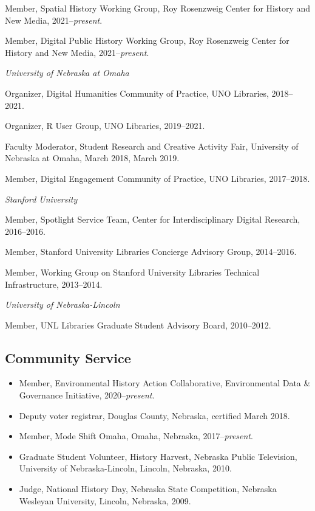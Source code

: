 \documentclass[10pt]{article}
\begin{document}
Member, Spatial History Working Group, Roy Rosenzweig Center for History and New Media, 2021--\textit{present}.

Member, Digital Public History Working Group, Roy Rosenzweig Center for History and New Media, 2021--\textit{present}.

\vspace{.4cm}

\textit{University of Nebraska at Omaha}

Organizer, Digital Humanities Community of Practice, UNO Libraries, 2018--2021.

Organizer, R User Group, UNO Libraries, 2019--2021.

Faculty Moderator, Student Research and Creative Activity Fair, University of
Nebraska at Omaha, March 2018, March 2019.

Member, Digital Engagement Community of Practice, UNO Libraries, 2017--2018.

\vspace{.4cm}

\textit{Stanford University}

Member, Spotlight Service Team, Center for Interdisciplinary Digital Research, 2016--2016.

Member, Stanford University Libraries Concierge Advisory Group, 2014--2016.

Member, Working Group on Stanford University Libraries Technical Infrastructure, 2013--2014.

\vspace{.4cm}

\textit{University of Nebraska-Lincoln}

Member, UNL Libraries Graduate Student Advisory Board, 2010--2012.

\subsection{Community Service}

\begin{itemize}
  \item Member, Environmental History Action Collaborative, Environmental Data \& Governance Initiative, 2020--\textit{present}.
  
  \item Deputy voter registrar, Douglas County, Nebraska, certified March 2018.
  
  \item Member, Mode Shift Omaha, Omaha, Nebraska, 2017--\textit{present}.
  
  \item Graduate Student Volunteer, History Harvest, Nebraska Public Television, University of Nebraska-Lincoln, Lincoln, Nebraska, 2010.
  
  \item Judge, National History Day, Nebraska State Competition, Nebraska Wesleyan University, Lincoln, Nebraska, 2009.
\end{itemize}
\end{document}
